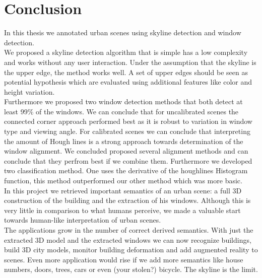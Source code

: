 \section{Conclusion}
In this thesis we annotated urban scenes using skyline detection and window
detection.\\

We proposed a skyline detection algorithm that is simple has a low complexity
and works without any user interaction.  Under the assumption that the skyline is the upper edge, the method works well.  A set of upper edges should be seen
as potential hypothesis which are evaluated using additional features like color
and height variation.\\

Furthermore we proposed two window detection methods that both detect at least
99\% of the windows.  We can conclude that for uncalibrated scenes the connected
corner approach performed best as it is robust to variation in window type and
viewing angle.  For calibrated scenes we can conclude that 
interpreting the amount of Hough lines is a strong approach
towards determination of the window alignment. 
We concluded proposed several alignment methods and can conclude that they
perfrom best if we combine them.
Furthermore we developed two classification method. One uses the derivative of
the houghlines Histogram function, this method outperformed our other method
which was more basic.\\

In this project we retrieved important semantics of an urban scene: a
full 3D construction of the building and the extraction of his windows.
Although this is very little in comparison to what humans perceive, we made a
valuable start towards human-like interpretation of urban scenes.\\

The applications grow in the number of correct derived semantics. With just the
extracted 3D model and the extracted windows we can now recognize buildings,
build 3D city models, monitor building deformation and add augmented reality
to scenes.  Even more application would rise if we add more semantics like
house numbers, doors, trees, cars or even (your stolen?) bicycle. The skyline is
the limit.

